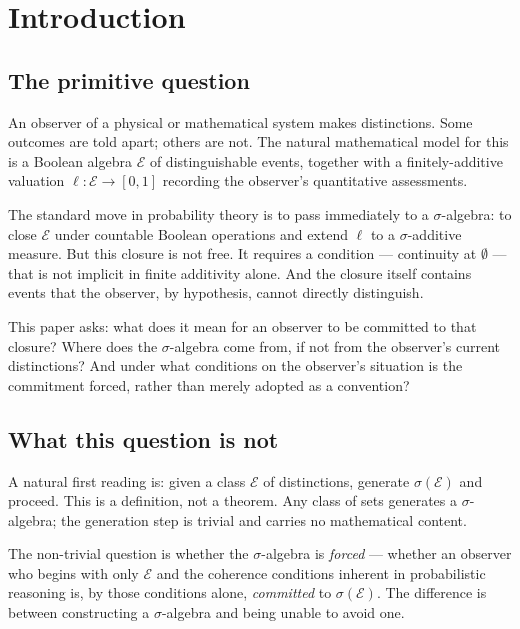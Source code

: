 \documentclass[12pt]{article}
\theoremstyle{definition}
\theoremstyle{remark}
\newcommand{\E}{\mathcal{E}}
\newcommand{\sigE}{\sigma(\mathcal{E})}
\begin{document}
\section{Introduction}

\subsection{The primitive question}

An observer of a physical or mathematical system makes distinctions.  Some outcomes are
told apart; others are not.  The natural mathematical model for this is a Boolean algebra
$\E$ of distinguishable events, together with a finitely-additive valuation $\ell : \E
\to [0,1]$ recording the observer's quantitative assessments.

The standard move in probability theory is to pass immediately to a $\sigma$-algebra:
to close $\E$ under countable Boolean operations and extend $\ell$ to a $\sigma$-additive
measure.  But this closure is not free.  It requires a condition --- continuity at
$\emptyset$ --- that is not implicit in finite additivity alone.  And the closure
itself contains events that the observer, by hypothesis, cannot directly distinguish.

This paper asks: what does it mean for an observer to be committed to that closure?
Where does the $\sigma$-algebra come from, if not from the observer's current
distinctions?  And under what conditions on the observer's situation is the commitment
forced, rather than merely adopted as a convention?

\subsection{What this question is not}

A natural first reading is: given a class $\E$ of distinctions, generate
$\sigE$ and proceed.  This is a definition, not a theorem.  Any class of sets
generates a $\sigma$-algebra; the generation step is trivial and carries no
mathematical content.

The non-trivial question is whether the $\sigma$-algebra is \emph{forced} --- whether
an observer who begins with only $\E$ and the coherence conditions inherent in
probabilistic reasoning is, by those conditions alone, \emph{committed} to $\sigE$.
The difference is between constructing a $\sigma$-algebra and being unable to avoid one.
\end{document}
